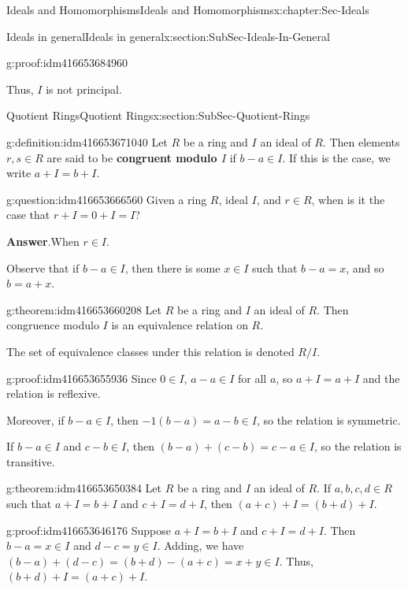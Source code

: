 \documentclass[oneside,10pt,]{book}
\newcommand{\terminology}[1]{\textbf{#1}}
\numberwithin{equation}{section}
\begin{document}
\begin{chapterptx}{Ideals and Homomorphisms}{}{Ideals and Homomorphisms}{}{}{x:chapter:Sec-Ideals}
\begin{sectionptx}{Ideals in general}{}{Ideals in general}{}{}{x:section:SubSec-Ideals-In-General}
\begin{proofptx}{}{g:proof:idm416653684960}
\par
Thus, \(I\) is not principal.%
\end{proofptx}
\end{sectionptx}
%
%
\typeout{************************************************}
\typeout{************************************************}
%
\begin{sectionptx}{Quotient Rings}{}{Quotient Rings}{}{}{x:section:SubSec-Quotient-Rings}
\begin{definition}{}{g:definition:idm416653671040}%
Let \(R\) be a ring and \(I\) an ideal of \(R\). Then elements \(r,s\in R\) are said to be \terminology{congruent modulo \(I\)} if \(b-a\in I\). If this is the case, we write \(a + I = b + I\).%
\end{definition}
\begin{question}{}{g:question:idm416653666560}%
Given a ring \(R\), ideal \(I\), and \(r\in R\), when is it the case that \(r + I = 0 + I = I\)?%
\par\smallskip%
\noindent\textbf{Answer}.\hypertarget{g:answer:idm416653663728}{}\quad{}When \(r\in I\).%
\end{question}
Observe that if \(b-a \in I\), then there is some \(x\in I\) such that \(b-a = x\), and so \(b = a+x\).%
\begin{theorem}{}{}{g:theorem:idm416653660208}%
Let \(R\) be a ring and \(I\) an ideal of \(R\). Then congruence modulo \(I\) is an equivalence relation on \(R\).%
\end{theorem}
The set of equivalence classes under this relation is denoted \(R/I\).%
\begin{proofptx}{}{g:proof:idm416653655936}
Since \(0\in I\), \(a-a \in I\) for all \(a\), so \(a + I = a+I\) and the relation is reflexive.%
\par
Moreover, if \(b-a \in I\), then \(-1(b-a) = a-b \in I\), so the relation is symmetric.%
\par
If \(b-a \in I\) and \(c-b\in I\), then \((b-a) + (c-b) = c-a \in I\), so the relation is transitive.%
\end{proofptx}
\begin{theorem}{}{}{g:theorem:idm416653650384}%
Let \(R\) be a ring and \(I\) an ideal of \(R\). If \(a,b,c,d\in R\) such that \(a+I = b+I\) and \(c+I = d+I\), then \((a+c) + I = (b+d) + I\).%
\end{theorem}
\begin{proofptx}{}{g:proof:idm416653646176}
Suppose \(a+I = b+I\) and \(c+I = d+I\). Then \(b-a =x \in I\) and \(d-c = y \in I\). Adding, we have \((b-a) + (d-c) = (b+d) - (a+c) = x+y \in I\). Thus, \((b+d) + I = (a+c) + I\).%

\end{proofptx}
\end{sectionptx}
\end{chapterptx}
\end{document}

